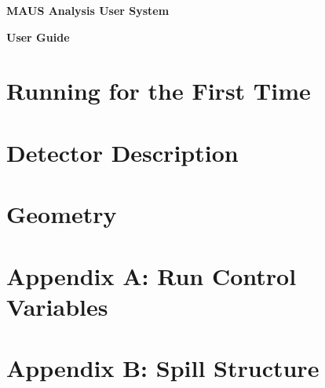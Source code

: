 \documentclass[a4paper, 10pt] {report}
\begin{document}
\vspace*{2.0cm}

\begin{center}
\Large{ \bf{MAUS Analysis User System} }

\Large{ \bf{User Guide} }
\end{center}

\chapter{Running for the First Time}




\chapter{Detector Description}
%
%
%
%
%

\chapter{Geometry}


\chapter{Appendix A: Run Control Variables}

\chapter{Appendix B: Spill Structure}
\end{document}
